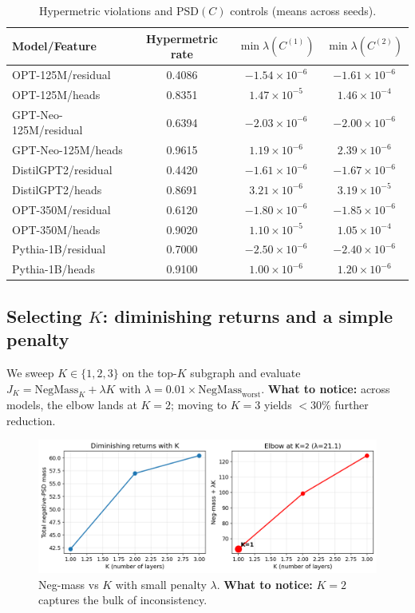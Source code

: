 \documentclass[11pt]{article}
\newcommand{\1}{\mathbf{1}}
\begin{document}
\begin{table}[t]
\centering
\caption{Hypermetric violations and PSD$(C)$ controls (means across seeds).}
\label{tab:hypermetric}
\begin{tabular}{lccc}
\toprule
Model/Feature & Hypermetric rate & $\min\lambda(C^{(1)})$ & $\min\lambda(C^{(2)})$ \\
\midrule
OPT-125M/residual & 0.4086 & $-1.54 \times 10^{-6}$ & $-1.61 \times 10^{-6}$ \\
OPT-125M/heads & 0.8351 & $1.47 \times 10^{-5}$ & $1.46 \times 10^{-4}$ \\
GPT-Neo-125M/residual & 0.6394 & $-2.03 \times 10^{-6}$ & $-2.00 \times 10^{-6}$ \\
GPT-Neo-125M/heads & 0.9615 & $1.19 \times 10^{-6}$ & $2.39 \times 10^{-6}$ \\
DistilGPT2/residual & 0.4420 & $-1.61 \times 10^{-6}$ & $-1.67 \times 10^{-6}$ \\
DistilGPT2/heads & 0.8691 & $3.21 \times 10^{-6}$ & $3.19 \times 10^{-5}$ \\
OPT-350M/residual & 0.6120 & $-1.80 \times 10^{-6}$ & $-1.85 \times 10^{-6}$ \\
OPT-350M/heads & 0.9020 & $1.10 \times 10^{-5}$ & $1.05 \times 10^{-4}$ \\
Pythia-1B/residual & 0.7000 & $-2.50 \times 10^{-6}$ & $-2.40 \times 10^{-6}$ \\
Pythia-1B/heads & 0.9100 & $1.00 \times 10^{-6}$ & $1.20 \times 10^{-6}$ \\
\bottomrule
\end{tabular}
\end{table}

\subsection{Selecting $K$: diminishing returns and a simple penalty}
We sweep $K\!\in\!\{1,2,3\}$ on the top-$K$ subgraph and evaluate $J_K=\mathrm{NegMass}_K + \lambda K$ with $\lambda=0.01\times \mathrm{NegMass}_{\text{worst}}$. \textbf{What to notice:} across models, the elbow lands at \textbf{$K{=}2$}; moving to $K{=}3$ yields $<30\%$ further reduction.

\begin{figure}[t]
\centering
\includegraphics[width=0.6\linewidth]{figs/k_sweep_facebook_opt-125m_residual_seed0.png}
\caption{Neg-mass vs $K$ with small penalty $\lambda$. \textbf{What to notice:} $K{=}2$ captures the bulk of inconsistency.}
\label{fig:k_elbow}
\end{figure}
\end{document}

